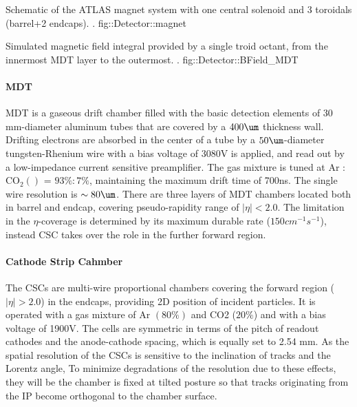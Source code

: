 {Schematic of the ATLAS magnet system with one central solenoid and 3 toroidals (barrel+2 endcaps). \cite{ATLAS_exp}.}
{fig::Detector::magnet}


{ Simulated magnetic field integral provided by a single troid octant, from the innermost MDT layer to the outermost. \cite{ATLAS_exp}.}
{fig::Detector::BField_MDT}





\paragraph{MDT}
MDT is a gaseous drift chamber filled with the basic detection elements of 30 mm-diameter aluminum tubes that are covered by a $400\um$ thickness wall. 
Drifting electrons are absorbed in the center of a tube by a $50\um$-diameter tungsten-Rhenium wire with a bias voltage of 3080V is applied, and read out by a low-impedance current sensitive preamplifier.
The gas mixture is tuned at Ar : $\mathrm{CO_2} ()$ = $93\%:7\%$, maintaining the maximum drift time of 700ns. The single wire resolution is $\sim 80\um$.
There are three layers of MDT chambers located both in barrel and endcap, covering pseudo-rapidity range of $|\eta|<2.0$.
The limitation in the $\eta$-coverage is determined by its maximum durable rate ($150 cm^{-1}s^{-1}$), instead CSC takes over the role in the further forward region.


\paragraph{Cathode Strip Cahmber}
The CSCs are multi-wire proportional chambers covering the forward region ($|\eta|>2.0$) in the endcaps, providing 2D position of incident particles.
It is operated with a gas mixture of Ar $(80\%)$ and CO2 ($20\%$) and with a bias voltage of 1900V.
The cells are symmetric in terms of the pitch of readout cathodes and the anode-cathode spacing, which is equally set to 2.54 mm.
As the spatial resolution of the CSCs is sensitive to the inclination of tracks and the Lorentz angle, To minimize degradations of the resolution due to these effects, they will be the chamber is fixed at tilted posture so that tracks originating from the IP become orthogonal to the chamber surface.


